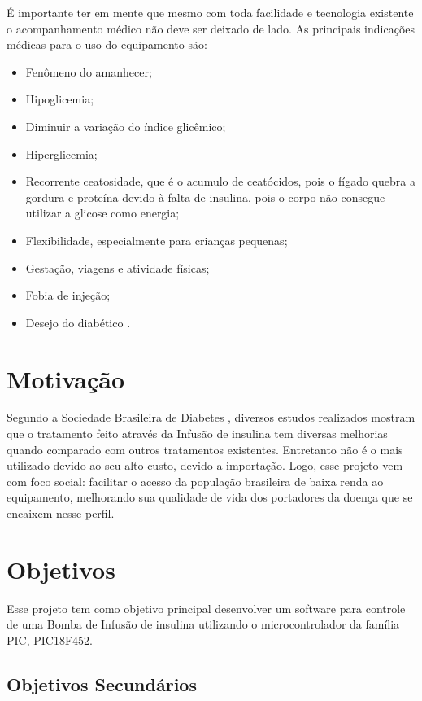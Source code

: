 É importante ter em mente que mesmo com toda facilidade e tecnologia existente o acompanhamento médico não deve ser deixado de lado. As principais indicações médicas para o uso do equipamento são:

\begin{itemize}
\item Fenômeno do amanhecer;
\item Hipoglicemia;
\item Diminuir a variação do índice glicêmico;
\item Hiperglicemia;
\item Recorrente ceatosidade, que é o acumulo de ceatócidos, pois o fígado quebra a gordura e proteína devido à falta de insulina, pois o corpo não consegue utilizar a glicose como energia;
\item Flexibilidade, especialmente para crianças pequenas;
\item Gestação, viagens e atividade físicas;
\item Fobia de injeção;
\item Desejo do diabético \cite{sbc2014, diabetes2013, portaldiabetes2009}.
\end{itemize}

\section{Motivação}
Segundo a Sociedade Brasileira de Diabetes \cite{sbc2014}, diversos estudos realizados mostram que o tratamento feito através da Infusão de insulina tem diversas melhorias quando comparado com outros tratamentos existentes. Entretanto não é o mais utilizado devido ao seu alto custo, devido a importação.
Logo, esse projeto vem com foco social: facilitar o acesso da população brasileira de baixa renda ao equipamento, melhorando sua qualidade de vida dos portadores da doença que se encaixem nesse perfil. 

\section{Objetivos}
Esse projeto tem como objetivo principal desenvolver um software para controle de uma Bomba de Infusão de insulina utilizando o microcontrolador da família PIC, PIC18F452. 

\subsection{Objetivos Secundários}

